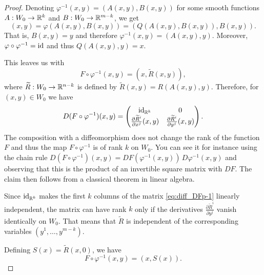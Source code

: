 \begin{proof}
	Denoting $\varphi^{-1}(x,y) = (A(x,y), B(x,y))$ for some smooth functions
	$A : W_0 \to \mathbb{R}^k$ and $B : W_0 \to \mathbb{R}^{m-k}$, we get
	\begin{equation}
		(x,y) = \varphi(A(x,y), B(x,y)) = (Q(A(x,y), B(x,y)), B(x,y)).
	\end{equation}
	That is, $B(x,y) = y$ and therefore $\varphi^{-1}(x,y) = (A(x,y), y)$.
	Moreover, $\varphi \circ \varphi^{-1} = \operatorname{id}$ and thus $Q(A(x,y),y) = x$.

	This leaves us with
	\begin{equation}
		F\circ\varphi^{-1}(x,y) = (x, \widetilde{R}(x,y)),
	\end{equation}
	where $\widetilde{R} : W_0 \to\mathbb{R}^{n-k}$ is defined by $\widetilde{R}(x,y) = R(A(x,y), y)$.
	Therefore, for $(x,y)\in W_0$ we have
	\begin{equation}\label{eq:diff_DFp-1}
		D(F\circ\varphi^{-1})(x,y) = \begin{pmatrix}
			\operatorname{id}_{\mathbb{R}^k}                                        & 0                                                 \\
			\frac{\partial\widetilde{R}^i}{\partial x^j}(x,y) & \frac{\partial\widetilde{R}^i}{\partial y^j}(x,y)
		\end{pmatrix}.
	\end{equation}
	The composition with a diffeomorphism does not change the rank of the function $F$ and
	thus the map $F\circ\varphi^{-1}$ is of rank $k$ on $W_0$.
	You can see it for instance using the chain rule
	$D(F\circ\varphi^{-1})(x,y) = DF(\varphi^{-1}(x,y))\, D\varphi^{-1}(x,y)$ and
	observing that this is the product of an invertible square matrix with $DF$.
	The claim then follows from a classical theorem in linear algebra.

	Since $\operatorname{id}_{\mathbb{R}^k}$ makes the first $k$ columns of the matrix \eqref{eq:diff_DFp-1}
	linearly independent, the matrix can have rank $k$ only if the derivatives
	$\frac{\partial \widetilde{R}^i}{\partial y^j}$ vanish identically on $W_0$.
	That means that $\widetilde{R}$ is independent of the corresponding variables
	$(y^1, \ldots, y^{m-k})$.

	Defining $S(x) = \widetilde{R}(x, 0)$, we have
	\begin{equation}
		F\circ\varphi^{-1}(x,y) = (x, S(x)).
	\end{equation}


\end{proof}
